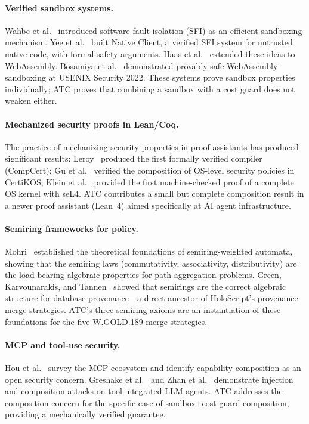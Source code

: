 \documentclass[sigconf]{acmart}
\newcommand{\ATC}{\textsc{ATC}}
\begin{document}
\paragraph{Verified sandbox systems.}
Wahbe et al.~\cite{wahbe1993efficient} introduced software fault isolation
(SFI) as an efficient sandboxing mechanism.  Yee et al.~\cite{yee2009native}
built Native Client, a verified SFI system for untrusted native code, with
formal safety arguments.  Haas et al.~\cite{haas2017wasm} extended these
ideas to WebAssembly.  Bosamiya et al.~\cite{cao2022wasmsandbox} demonstrated
provably-safe WebAssembly sandboxing at USENIX Security 2022.  These systems
prove sandbox properties individually; \ATC{} proves that combining a sandbox
with a cost guard does not weaken either.

\paragraph{Mechanized security proofs in Lean/Coq.}
The practice of mechanizing security properties in proof assistants has
produced significant results: Leroy~\cite{leroy2009compcert} produced the
first formally verified compiler (CompCert); Gu et al.~\cite{gu2016certikos}
verified the composition of OS-level security policies in CertiKOS; Klein et
al.~\cite{klein2009sel4} provided the first machine-checked proof of a complete
OS kernel with seL4.  \ATC{} contributes a small but complete composition
result in a newer proof assistant (Lean~4) aimed specifically at AI agent
infrastructure.

\paragraph{Semiring frameworks for policy.}
Mohri~\cite{mohri2002semiring} established the theoretical foundations of
semiring-weighted automata, showing that the semiring laws (commutativity,
associativity, distributivity) are the load-bearing algebraic properties for
path-aggregation problems.  Green, Karvounarakis, and Tannen~\cite{green-semiring2007}
showed that semirings are the correct algebraic structure for database
provenance---a direct ancestor of HoloScript's provenance-merge strategies.
\ATC{}'s three semiring axioms are an instantiation of these foundations for
the five W.GOLD.189 merge strategies.

\paragraph{MCP and tool-use security.}
Hou et al.~\cite{hou2025mcp} survey the MCP ecosystem and identify capability
composition as an open security concern.  Greshake et al.~\cite{greshake2023}
and Zhan et al.~\cite{zhan2024} demonstrate injection and composition attacks
on tool-integrated LLM agents.  \ATC{} addresses the composition concern for
the specific case of sandbox+cost-guard composition, providing a mechanically
verified guarantee.
\end{document}

